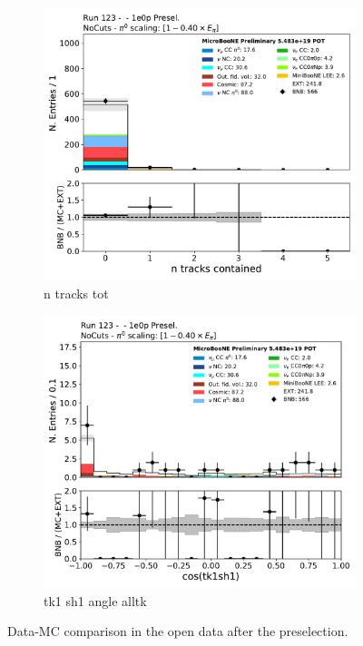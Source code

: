 \begin{figure}[H] 
\begin{center}
    \begin{subfigure}[b]{0.45\textwidth}
    \centering
    \includegraphics[width=1.00\textwidth]{1e0p/dataMCRun123/n_tracks_tot.pdf}
    \caption{\label{fig:1e0p:dataMCRun1:n_tk_tot} n tracks tot }
    \end{subfigure}
    \begin{subfigure}[b]{0.45\textwidth}
    \centering
    \includegraphics[width=1.00\textwidth]{1e0p/dataMCRun123/tk1sh1_angle_alltk.pdf}
    \caption{\label{fig:1e0p:dataMCRun1:shtkang} tk1 sh1 angle alltk }
    \end{subfigure}
\caption{\label{fig:1e0p:dataMCRun1:exitingtrack_opendata}Data-MC comparison in the open data after the \zpsel preselection.}
\end{center}
\end{figure}

